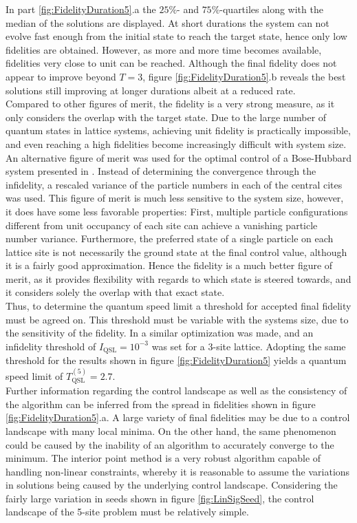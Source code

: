 In part \ref{fig:FidelityDuration5}.a the $25\%$- and $75\%$-quartiles along with the median of the solutions are displayed. At short durations the system can not evolve fast enough from the initial state to reach the target state, hence only low fidelities are obtained. However, as more and more time becomes available, fidelities very close to unit can be reached. Although the final fidelity does not appear to improve beyond $T=3$, figure \ref{fig:FidelityDuration5}.b reveals the best solutions still improving at longer durations albeit at a reduced rate.\\
Compared to other figures of merit, the fidelity is a very strong measure, as it only considers the overlap with the target state. Due to the large number of quantum states in lattice systems, achieving unit fidelity is practically impossible, and even reaching a high fidelities become increasingly difficult with system size. An alternative figure of merit was used for the optimal control of a Bose-Hubbard system presented in \cite{FrankBloch}. Instead of determining the convergence through the infidelity, a rescaled variance of the particle numbers in each of the central cites was used. This figure of merit is much less sensitive to the system size, however, it does have some less favorable properties: First, multiple particle configurations different from unit occupancy of each site can achieve a vanishing particle number variance. Furthermore, the preferred state of a single particle on each lattice site is not necessarily the ground state at the final control value, although it is a fairly good approximation. Hence the fidelity is a much better figure of merit, as it provides flexibility with regards to which state is steered towards, and it considers solely the overlap with that exact state.\\
Thus, to determine the quantum speed limit a threshold for accepted final fidelity must be agreed on. This threshold must be variable with the systems size, due to the sensitivity of the fidelity. In \cite{MajaJulie} a similar optimization was made, and an infidelity threshold of $I_{\mathrm{QSL}} = 10^{-3}$ was set for a 3-site lattice. Adopting the same threshold for the results shown in figure \ref{fig:FidelityDuration5} yields a quantum speed limit of $T_{\mathrm{QSL}}^{(5)} = 2.7$.\\

Further information regarding the control landscape as well as the consistency of the algorithm can be inferred from the spread in fidelities shown in figure \ref{fig:FidelityDuration5}.a. A large variety of final fidelities may be due to a control landscape with many local minima. On the other hand, the same phenomenon could be caused by the inability of an algorithm to accurately converge to the minimum. The interior point method is a very robust algorithm capable of handling non-linear constraints, whereby it is reasonable to assume the variations in solutions being caused by the underlying control landscape. Considering the fairly large variation in seeds shown in figure \ref{fig:LinSigSeed}, the control landscape of the 5-site problem must be relatively simple.


